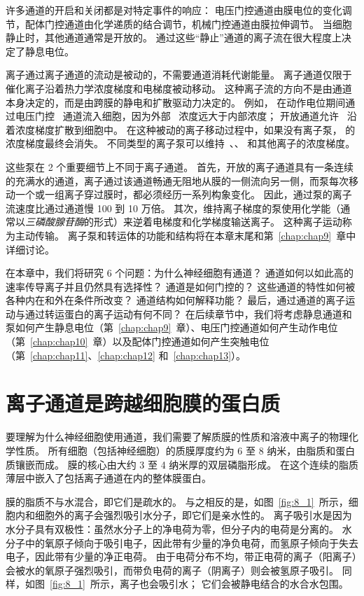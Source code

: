 许多通道的开启和关闭都是对特定事件的响应：
电压门控通道由膜电位的变化调节，配体门控通道由化学递质的结合调节，机械门控通道由膜拉伸调节。
当细胞静止时，其他通道通常是开放的。
通过这些“静止”通道的离子流在很大程度上决定了静息电位。


离子通过离子通道的流动是被动的，不需要通道消耗代谢能量。
离子通道仅限于催化离子沿着热力学浓度梯度和电梯度被动移动。
这种离子流的方向不是由通道本身决定的，而是由跨膜的静电和扩散驱动力决定的。
例如， 在动作电位期间通过电压门控~ 通道流入细胞，因为外部~ 浓度远大于内部浓度；
开放通道允许~ 沿着浓度梯度扩散到细胞中。
在这种被动的离子移动过程中，如果没有离子泵， 的浓度梯度最终会消失。
不同类型的离子泵可以维持~、、 和其他离子的浓度梯度。


这些泵在 2 个重要细节上不同于离子通道。
首先，开放的离子通道具有一条连续的充满水的通道，离子通过该通道畅通无阻地从膜的一侧流向另一侧，而泵每次移动一个或一组离子穿过膜时，都必须经历一系列构象变化。
因此，通过泵的离子流速度比通过通道慢 100 到 10 万倍。
其次，维持离子梯度的泵使用化学能（通常以\textit{三磷酸腺苷酶}的形式）来逆着电梯度和化学梯度输送离子。
这种离子运动称为主动传输。
离子泵和转运体的功能和结构将在本章末尾和第~\ref{chap:chap9}~章中详细讨论。


在本章中，我们将研究 6 个问题：为什么神经细胞有通道？
通道如何以如此高的速率传导离子并且仍然具有选择性？ 
通道是如何门控的？
这些通道的特性如何被各种内在和外在条件所改变？
通道结构如何解释功能？
最后，通过通道的离子运动与通过转运蛋白的离子运动有何不同？
在后续章节中，我们将考虑静息通道和泵如何产生静息电位（第~\ref{chap:chap9}~章）、电压门控通道如何产生动作电位（第~\ref{chap:chap10}~章）以及配体门控通道如何产生突触电位（第~\ref{chap:chap11}、\ref{chap:chap12} 和~\ref{chap:chap13}）。



\section{离子通道是跨越细胞膜的蛋白质}

要理解为什么神经细胞使用通道，我们需要了解质膜的性质和溶液中离子的物理化学性质。
所有细胞（包括神经细胞）的质膜厚度约为 6 至 8 纳米，由脂质和蛋白质镶嵌而成。
膜的核心由大约 3 至 4 纳米厚的双层磷脂形成。
在这个连续的脂质薄层中嵌入了包括离子通道在内的整体膜蛋白。


膜的脂质不与水混合，即它们是疏水的。
与之相反的是，如图~\ref{fig:8_1}~所示，细胞内和细胞外的离子会强烈吸引水分子，即它们是亲水性的。
离子吸引水是因为水分子具有双极性：虽然水分子上的净电荷为零，但分子内的电荷是分离的。
水分子中的氧原子倾向于吸引电子，因此带有少量的净负电荷，而氢原子倾向于失去电子，因此带有少量的净正电荷。
由于电荷分布不均，带正电荷的离子（阳离子）会被水的氧原子强烈吸引，而带负电荷的离子（阴离子）则会被氢原子吸引。
同样，如图~\ref{fig:8_1}~所示，离子也会吸引水；
它们会被静电结合的水合水包围。


